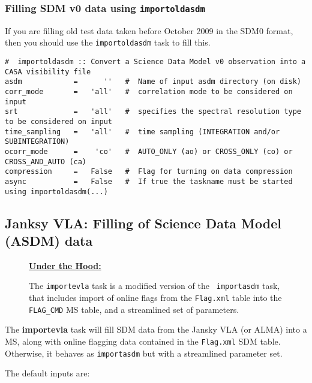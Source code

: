 \subsubsection{Filling SDM v0 data using {\tt importoldasdm}}
\label{section:io.import.asdm.old}

If you are filling old test data taken
before October 2009 in the SDM0 format, then you should use the 
{\tt importoldasdm} task to fill this.
\small
\begin{verbatim}
#  importoldasdm :: Convert a Science Data Model v0 observation into a CASA visibility file
asdm            =      ''   #  Name of input asdm directory (on disk)
corr_mode       =   'all'   #  correlation mode to be considered on input
srt             =   'all'   #  specifies the spectral resolution type to be considered on input
time_sampling   =   'all'   #  time sampling (INTEGRATION and/or SUBINTEGRATION)
ocorr_mode      =    'co'   #  AUTO_ONLY (ao) or CROSS_ONLY (co) or CROSS_AND_AUTO (ca)
compression     =   False   #  Flag for turning on data compression
async           =   False   #  If true the taskname must be started using importoldasdm(...)
\end{verbatim}
\normalsize

\subsection{Janksy VLA: Filling of Science Data Model (ASDM) data}
\label{section:io.import.evla}

\begin{wrapfigure}{r}{2.5in}
  \begin{boxedminipage}{2.5in}
     \centerline{\underline{\bf Under the Hood:}}
     The {\tt importevla} task is a modified version of the {\tt
     importasdm} task, that includes import of online flags from 
     the {\tt Flag.xml} table into the {\tt FLAG\_CMD} MS table,
     and a streamlined set of parameters.
  \end{boxedminipage}
\end{wrapfigure}

The {\bf importevla} task will fill SDM data from the Jansky VLA (or ALMA) into
a MS, along with online flagging data contained in the {\tt Flag.xml}
SDM table.  Otherwise, it behaves as {\tt importasdm} but with a
streamlined parameter set.

The default inputs are:

